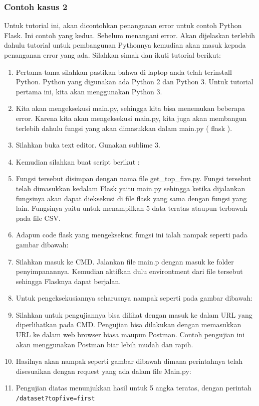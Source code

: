 \subsubsection{Contoh kasus 2}
Untuk tutorial ini, akan dicontohkan penanganan error untuk contoh Python Flask. Ini contoh yang kedua. Sebelum menangani error. Akan dijelaskan terlebih dahulu tutorial untuk pembangunan Pythonnya kemudian akan masuk kepada penanganan error yang ada. Silahkan simak dan ikuti tutorial berikut:
\begin{enumerate}
\item Pertama-tama silahkan pastikan bahwa di laptop anda telah terinstall Python. Python yang digunakan ada Python 2 dan Python 3. Untuk tutorial pertama ini, kita akan menggunakan Python 3.
\item Kita akan mengeksekusi main.py, sehingga kita bisa menemukan beberapa error. Karena kita akan mengeksekusi main.py, kita juga akan membangun terlebih dahulu fungsi yang akan dimasukkan dalam main.py ( flask ).
\item Silahkan buka text editor. Gunakan sublime 3.
\item Kemudian silahkan buat script berikut :
\item Fungsi tersebut disimpan dengan nama file get\_top\_five.py. Fungsi tersebut telah dimasukkan kedalam Flask yaitu main.py sehingga ketika dijalankan fungsinya akan dapat dieksekusi di file flask yang sama dengan fungsi yang lain. Fungsinya yaitu untuk menampilkan 5 data teratas ataupun terbawah pada file CSV.
\item Adapun code flask yang mengeksekusi fungsi ini ialah nampak seperti pada gambar dibawah:
\item Silahkan masuk ke CMD. Jalankan file main.p dengan masuk ke folder penyimpanannya. Kemudian aktifkan dulu environtment dari file tersebut sehingga Flasknya dapat berjalan.
\item Untuk pengeksekusiannya seharusnya nampak seperti pada gambar dibawah:
\item Silahkan untuk pengujiannya bisa dilihat dengan masuk ke dalam URL yang diperlihatkan pada CMD. Pengujian bisa dilakukan dengan memasukkan URL ke dalam web browser biasa maupun Postman. Contoh pengujian ini akan menggunakan Postman biar lebih mudah dan rapih.
\item Hasilnya akan nampak seperti gambar dibawah dimana perintahnya telah disesuaikan dengan request yang ada dalam file Main.py:
\item Pengujian diatas menunjukkan hasil untuk 5 angka teratas, dengan perintah \verb|/dataset?topfive=first|

\end{enumerate}
